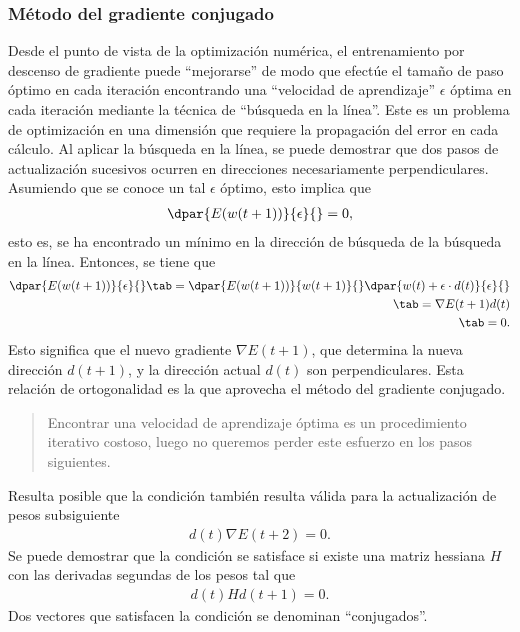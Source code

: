 \subsubsection{Método del gradiente conjugado}
%
Desde el punto de vista de la optimización numérica, el entrenamiento
por descenso de gradiente puede ``mejorarse'' de modo que efectúe el
tamaño de paso óptimo en cada iteración encontrando una ``velocidad de
aprendizaje'' $\epsilon$ óptima en cada iteración mediante la técnica
de ``búsqueda en la línea''. Este es un problema de optimización en
una dimensión que requiere la propagación del error en cada cálculo.
Al aplicar la búsqueda en la línea, se puede demostrar que dos pasos
de actualización sucesivos ocurren en direcciones necesariamente
perpendiculares. Asumiendo que se conoce un tal $\epsilon$ óptimo,
esto implica que
%
\begin{align*}
  \dpar{E(w(t+1))}{\epsilon}{}=0,
\end{align*}
%
esto es, se ha encontrado un mínimo en la dirección
de búsqueda de la búsqueda en la línea. Entonces, se tiene que
%
\begin{align}
\label{mlp9}
  \dpar{E(w(t+1))}{\epsilon}{} \tab= \dpar{E(w(t+1))}{w(t+1)}{}
    \dpar{w(t)+\epsilon\cdot d(t)}{\epsilon}{} \notag\\
  \tab= \nabla E(t+1) d(t) \notag\\
  \tab=0.
\end{align}
%
Esto significa que el nuevo gradiente $\nabla{}E(t+1)$, que determina
la nueva dirección $d(t+1)$, y la dirección actual $d(t)$ son
perpendiculares. Esta relación de ortogonalidad es la que aprovecha
el método del gradiente conjugado.
%
\begin{quote}
  Encontrar una velocidad de aprendizaje óptima es un procedimiento
  iterativo costoso, luego no queremos perder este esfuerzo en los
  pasos siguientes.
\end{quote}
%
Resulta posible que la condición  también resulta válida
para la actualización de pesos subsiguiente
%
\begin{align}
\label{mlp10}
  d(t)\nabla{}E(t+2)=0.
\end{align}
%
Se puede demostrar que la condición  se satisface si existe
una matriz hessiana $H$ con las derivadas segundas de los pesos tal
que
%
\begin{align}\label{mlp11}
  d(t) H d(t+1) =0.
\end{align}
%
Dos vectores que satisfacen la condición  se denominan
``conjugados''.

